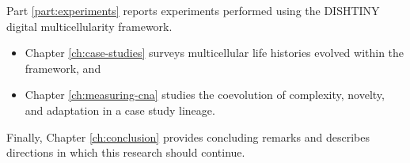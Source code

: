 Part \ref{part:experiments} reports experiments performed using the DISHTINY digital multicellularity framework.
\begin{itemize}
\item Chapter \ref{ch:case-studies} surveys multicellular life histories evolved within the framework, and
\item Chapter \ref{ch:measuring-cna} studies the coevolution of complexity, novelty, and adaptation in a case study lineage.
\end{itemize}

Finally, Chapter \ref{ch:conclusion} provides concluding remarks and describes directions in which this research should continue.
